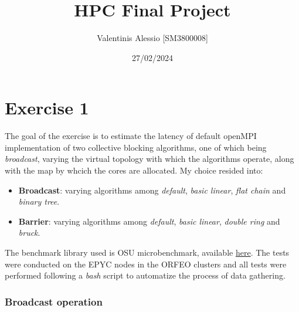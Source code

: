 \documentclass{article}
\title{HPC Final Project}
\author{Valentinis Alessio [SM3800008]}
\date{27/02/2024}
\begin{document}
	\maketitle
	\tableofcontents
	
	\part{Exercise 1}
	
	The goal of the exercise is to estimate the latency of default openMPI implementation of two collective blocking algorithms, one of which being \textit{broadcast}, varying the virtual topology with which the algorithms operate, along with the map by whcich the cores are allocated.
	My choice resided into:
	\begin{itemize}
		\item \textbf{Broadcast}: varying algorithms among \textit{default}, \textit{basic linear}, \textit{flat chain} and \textit{binary tree}.\\
		\item \textbf{Barrier}: varying algorithms among \textit{default}, \textit{basic linear}, \textit{double ring} and \textit{bruck}.
	\end{itemize}
	
	The benchmark library used is OSU microbenchmark, available \href{https://mvapich.cse.ohio-state.edu/benchmarks/}{here}.
	The tests were conducted on the EPYC nodes in the ORFEO clusters and all tests were performed following a \textit{bash} script to automatize the process of data gathering.
	
	\section{Broadcast operation}
	
\end{document}
